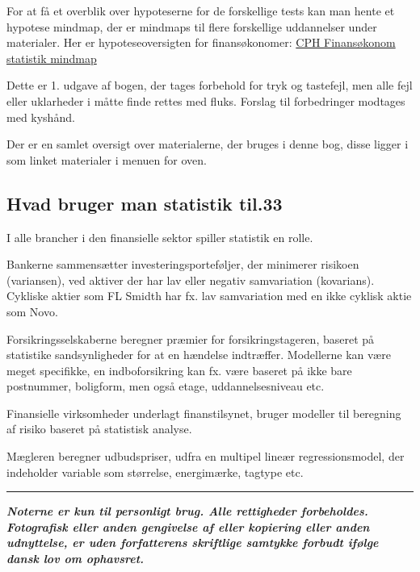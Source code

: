 \documentclass[]{book}
\theoremstyle{definition}
\theoremstyle{definition}
\theoremstyle{definition}
\theoremstyle{remark}
\begin{document}
For at få et overblik over hypoteserne for de forskellige tests kan man
hente et hypotese mindmap, der er mindmaps til flere forskellige
uddannelser under materialer. Her er hypoteseoversigten for
finansøkonomer:
\href{https://drive.google.com/uc?export=download\&id=0B1E7VnhxsDMlQ1Zhdjh5WTJ4bnM}{CPH
Finansøkonom statistik mindmap}

Dette er 1. udgave af bogen, der tages forbehold for tryk og tastefejl,
men alle fejl eller uklarheder i måtte finde rettes med fluks. Forslag
til forbedringer modtages med kyshånd.

Der er en samlet oversigt over materialerne, der bruges i denne bog,
disse ligger i som linket materialer i menuen for oven.

\hypertarget{hvad-bruger-man-statistik-til.33}{%
\subsection{Hvad bruger man statistik
til.33}\label{hvad-bruger-man-statistik-til.33}}

I alle brancher i den finansielle sektor spiller statistik en rolle.

Bankerne sammensætter investeringsporteføljer, der minimerer risikoen
(variansen), ved aktiver der har lav eller negativ samvariation
(kovarians). Cykliske aktier som FL Smidth har fx. lav samvariation med
en ikke cyklisk aktie som Novo.

Forsikringsselskaberne beregner præmier for forsikringstageren, baseret
på statistike sandsynligheder for at en hændelse indtræffer. Modellerne
kan være meget specifikke, en indboforsikring kan fx. være baseret på
ikke bare postnummer, boligform, men også etage, uddannelsesniveau etc.

Finansielle virksomheder underlagt finanstilsynet, bruger modeller til
beregning af risiko baseret på statistisk analyse.

Mægleren beregner udbudspriser, udfra en multipel lineær
regressionsmodel, der indeholder variable som størrelse, energimærke,
tagtype etc.

\begin{center}\rule{0.5\linewidth}{\linethickness}\end{center}

\textbf{\emph{Noterne er kun til personligt brug. Alle rettigheder
forbeholdes. Fotografisk eller anden gengivelse af eller kopiering eller
anden udnyttelse, er uden forfatterens skriftlige samtykke forbudt
ifølge dansk lov om ophavsret.}}
\end{document}
